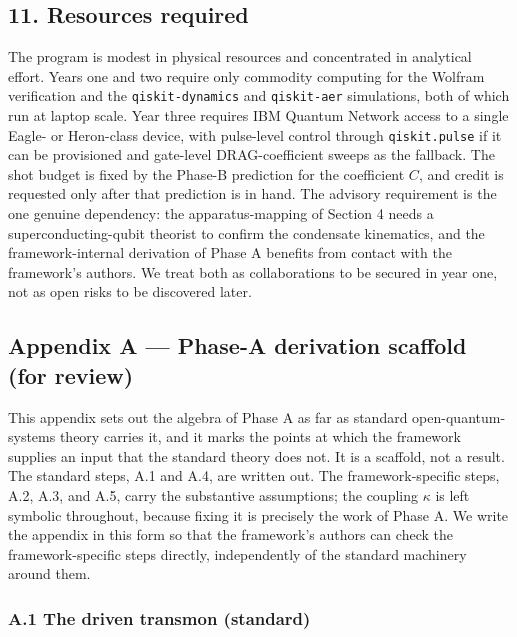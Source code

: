 \documentclass[
  11pt,
]{article}
\begin{document}
\hypertarget{resources-required}{%
\subsection{11. Resources required}\label{resources-required}}

The program is modest in physical resources and concentrated in
analytical effort. Years one and two require only commodity computing
for the Wolfram verification and the \texttt{qiskit-dynamics} and
\texttt{qiskit-aer} simulations, both of which run at laptop scale. Year
three requires IBM Quantum Network access to a single Eagle- or
Heron-class device, with pulse-level control through
\texttt{qiskit.pulse} if it can be provisioned and gate-level
DRAG-coefficient sweeps as the fallback. The shot budget is fixed by the
Phase-B prediction for the coefficient \(C\), and credit is requested
only after that prediction is in hand. The advisory requirement is the
one genuine dependency: the apparatus-mapping of Section 4 needs a
superconducting-qubit theorist to confirm the condensate kinematics, and
the framework-internal derivation of Phase A benefits from contact with
the framework's authors. We treat both as collaborations to be secured
in year one, not as open risks to be discovered later.

\hypertarget{appendix-a-phase-a-derivation-scaffold-for-review}{%
\subsection{Appendix A --- Phase-A derivation scaffold (for
review)}\label{appendix-a-phase-a-derivation-scaffold-for-review}}

This appendix sets out the algebra of Phase A as far as standard
open-quantum-systems theory carries it, and it marks the points at which
the framework supplies an input that the standard theory does not. It is
a scaffold, not a result. The standard steps, A.1 and A.4, are written
out. The framework-specific steps, A.2, A.3, and A.5, carry the
substantive assumptions; the coupling \(\kappa\) is left symbolic
throughout, because fixing it is precisely the work of Phase A. We write
the appendix in this form so that the framework's authors can check the
framework-specific steps directly, independently of the standard
machinery around them.

\hypertarget{a.1-the-driven-transmon-standard}{%
\subsubsection{A.1 The driven transmon
(standard)}\label{a.1-the-driven-transmon-standard}}
\end{document}
